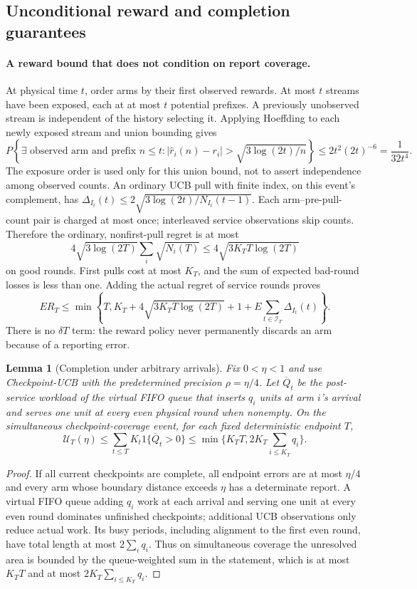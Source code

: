 \documentclass[11pt]{article}
\newtheorem{lemma}[theorem]{Lemma}
\theoremstyle{remark}
\begin{document}
\subsection{Unconditional reward and completion guarantees}
\label{app:joint}
\paragraph{A reward bound that does not condition on report coverage.}
At physical time $t$, order arms by their first observed rewards. At most
$t$ streams have been exposed, each at at most $t$ potential prefixes. A
previously unobserved stream is independent of the history selecting it.
Applying Hoeffding to each newly exposed stream and union bounding gives
\[
 P\left\{\exists\text{ observed arm and prefix }n\le t:
 |\hat r_i(n)-r_i|>
        \sqrt{3\log(2t)/n}\right\}
 \le2t^2(2t)^{-6}=\frac1{32t^4}.
\]
The exposure order is used only for this union bound, not to assert
independence among observed counts. An ordinary UCB pull with finite index,
on this event's complement, has
$\Delta_{I_t}(t)\le2\sqrt{3\log(2t)/N_{I_t}(t-1)}$.
Each arm--pre-pull-count pair is charged at most once; interleaved service
observations skip counts. Therefore the ordinary, nonfirst-pull regret is
at most
\[
 4\sqrt{3\log(2T)}\sum_i\sqrt{N_i(T)}
 \le4\sqrt{3K_TT\log(2T)}
\]
on good rounds. First pulls cost at most $K_T$, and the sum of expected
bad-round losses is less than one. Adding the actual regret of service
rounds proves
\[
 ER_T\le\min\left\{T,K_T+4\sqrt{3K_TT\log(2T)}+1+
       E\sum_{t\in\mathcal I_T}\Delta_{I_t}(t)\right\}.
\]
There is no $\delta T$ term: the reward policy never permanently discards an
arm because of a reporting error.


\begin{lemma}[Completion under arbitrary arrivals]
\label{app:completion_general}
Fix $0<\eta<1$ and use Checkpoint-UCB with the predetermined precision
$\rho=\eta/4$. Let $\overline Q_t$ be the post-service workload of the
virtual FIFO queue that inserts $q_i$ units at arm $i$'s arrival and serves
one unit at every even physical round when nonempty. On the simultaneous
checkpoint-coverage event, for each fixed deterministic endpoint $T$,
\[
 \mathcal U_T(\eta)\le
 \sum_{t\le T}K_t1\{\overline Q_t>0\}
 \le\min\{K_TT,2K_T\sum_{i\le K_T}q_i\}.
\]
\end{lemma}
\begin{proof}
If all current checkpoints are complete, all endpoint errors are at most $\eta/4$ and every arm whose
boundary distance exceeds $\eta$ has a determinate report. A virtual FIFO
queue adding $q_i$ work at each arrival and serving one unit at every even
round dominates unfinished checkpoints; additional UCB observations only
reduce actual work. Its busy periods, including alignment to the first even
round, have total length at most $2\sum_iq_i$. Thus on simultaneous coverage the unresolved area is bounded by the
queue-weighted sum in the statement, which is at most $K_TT$ and at most
$2K_T\sum_{i\le K_T}q_i$.
\end{proof}
\end{document}
